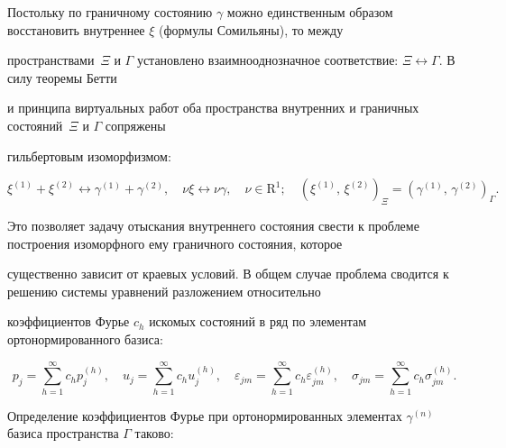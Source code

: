 Постольку по граничному состоянию $\gamma$ можно единственным образом восстановить внутреннее $\xi$ (формулы Сомильяны), то между

пространствами~$\Xi$ и $\Gamma$ установлено взаимнооднозначное соответствие: $\Xi \leftrightarrow \Gamma$. В силу теоремы Бетти

и принципа виртуальных работ \cite{penkov:GAG} оба пространства внутренних и граничных состояний~$\Xi$ и $\Gamma$ сопряжены

гильбертовым изоморфизмом:

$$

\xi^{(1)} + \xi ^{(2)} \leftrightarrow \gamma ^{(1)} + \gamma ^{(2)}, \quad \nu \xi \leftrightarrow \nu \gamma, \quad \nu \in

\mathrm{R} ^{1}; \quad \left( \xi ^{( 1 )}, \, \xi ^{( 2 )} \right)_{\Xi} = \left( \gamma^{( 1 )}, \, \gamma^{( 2 )} \right)

_{\Gamma}.

$$

Это позволяет задачу отыскания внутреннего состояния свести к проблеме построения изоморфного ему граничного состояния, которое

существенно зависит от краевых условий. В общем случае проблема сводится к решению системы уравнений разложением относительно

коэффициентов Фурье $c _{h}$ искомых состояний в ряд по элементам ортонормированного базиса:

$$

p_{j} = \sum_{h = 1}^{\infty } c_h p_j^{(h)}, \quad u_{j} = \sum_{h = 1}^{\infty } c_h u_j^{(h)}, \quad \varepsilon_{jm} = \sum

_{h = 1}^{\infty } c_h \varepsilon_{jm}^{(h)}, \quad \sigma_{jm} = \sum_{h = 1}^{\infty } c_{h} \sigma_{jm}^{(h)}.

$$



Определение коэффициентов Фурье при ортонормированных элемен\-тах $\gamma ^{(n)}$ базиса пространства $\Gamma$ таково:



